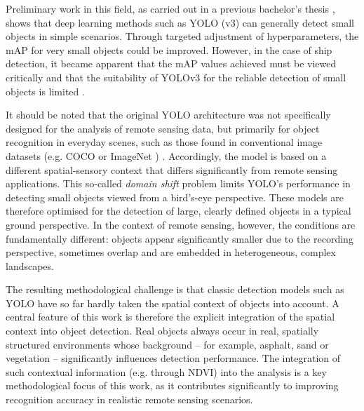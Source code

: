 Preliminary work in this field, as carried out in a previous bachelor's thesis \cite{Balzer2022}, shows that deep learning methods such as \acrfull{YOLO} (v3) can generally detect small objects in simple scenarios. Through targeted adjustment of hyperparameters, the \acrfull{mAP} for very small objects could be improved. However, in the case of ship detection, it became apparent that the \acrshort{mAP} values achieved must be viewed critically and that the suitability of \acrshort{YOLO}v3 for the reliable detection of small objects is limited \cite{Balzer2022}.

It should be noted that the original \acrfull{YOLO} architecture was not specifically designed for the analysis of remote sensing data, but primarily for object recognition in everyday scenes, such as those found in conventional image datasets (e.g. \acrshort{COCO}\cite{lin2015} or ImageNet \cite{imagenet1,imagenet2}) \cite{redmon2016,yolov3_redmon,wang2024,yolov12}. Accordingly, the model is based on a different spatial-sensory context that differs significantly from remote sensing applications. This so-called \emph{domain shift} problem limits \acrshort{YOLO}'s performance in detecting small objects viewed from a bird's-eye perspective. These models are therefore optimised for the detection of large, clearly defined objects in a typical ground perspective. In the context of remote sensing, however, the conditions are fundamentally different: objects appear significantly smaller due to the recording perspective, sometimes overlap and are embedded in heterogeneous, complex landscapes.
 
The resulting methodological challenge is that classic detection models such as \acrshort{YOLO} have so far hardly taken the spatial context of objects into account. A central feature of this work is therefore the explicit integration of the spatial context into object detection. Real objects always occur in real, spatially structured environments whose background – for example, asphalt, sand or vegetation – significantly influences detection performance. The integration of such contextual information (e.g. through \acrshort{NDVI}) into the analysis is a key methodological focus of this work, as it contributes significantly to improving recognition accuracy in realistic remote sensing scenarios.

